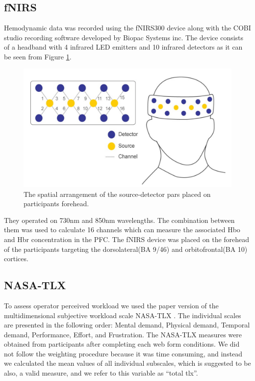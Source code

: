 \documentclass[../main/Feedback.tex]{subfiles}
\begin{document}
\subsection{fNIRS}
Hemodynamic data was recorded using the fNIRS300 device along with the COBI studio recording software developed by Biopac Systems inc. 
The device consists of a headband with 4 infrared LED emitters and 10 infrared detectors as it can be seen from Figure \ref{fig:source-detector-diagram}. 				
\begin{figure}[h]
	\centering
	\includegraphics[width=0.7\linewidth]{../figures/source-detector-diagram}
	\caption[fNIRS source-detector diagram]{The spatial arrangement of the source-detector pars placed on participants forehead.}
	\label{fig:source-detector-diagram}
\end{figure}
They operated on 730nm and 850nm wavelengths. 
The combination between them was used to calculate 16 channels which can measure the associated Hbo and Hbr concentration in the PFC. 
The fNIRS device was placed on the forehead of the participants targeting the dorsolateral(BA 9/46) and orbitofrontal(BA 10) cortices.

\subsection{NASA-TLX}
To assess operator perceived workload we used the paper version of the multidimensional subjective workload scale NASA-TLX \cite{nasatlx}.
The individual scales are presented in the following order: Mental demand, Physical demand, Temporal demand, Performance, Effort, and Frustration. 
The NASA-TLX measures were obtained from participants after completing each web form conditions. We did not follow the weighting procedure because it was time consuming, and instead we calculated the mean values of all individual subscales, which is suggested to be also, a valid measure\cite{hart2006nasa}, and we refer to this variable as ``total tlx''.
\end{document}
